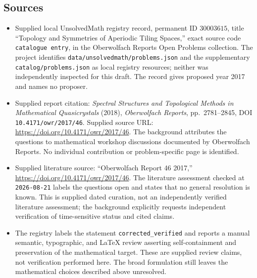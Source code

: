 \documentclass[11pt]{article}
\begin{document}
\subsection{Sources}
\begin{itemize}
\item Supplied local UnsolvedMath registry record, permanent ID \(30003615\), title ``Topology and Symmetries of Aperiodic Tiling Spaces,'' exact source code \texttt{catalogue entry}, in the Oberwolfach Reports Open Problems collection. The project identifies \texttt{data/unsolvedmath/problems.json} and the supplementary \texttt{catalog/problems.json} as local registry resources; neither was independently inspected for this draft. The record gives proposed year 2017 and names no proposer.
\item Supplied report citation: \emph{Spectral Structures and Topological Methods in Mathematical Quasicrystals} (2018), \emph{Oberwolfach Reports}, pp.\ 2781--2845, DOI \texttt{10.4171/owr/2017/46}. Supplied source URL: \url{https://doi.org/10.4171/owr/2017/46}. The background attributes the questions to mathematical workshop discussions documented by Oberwolfach Reports. No individual contribution or problem-specific page is identified.
\item Supplied literature source: ``Oberwolfach Report 46 2017,'' \url{https://doi.org/10.4171/owr/2017/46}. The literature assessment checked at \texttt{2026-08-21} labels the questions open and states that no general resolution is known. This is supplied dated curation, not an independently verified literature assessment; the background explicitly requests independent verification of time-sensitive status and cited claims.
\item The registry labels the statement \texttt{corrected\_verified} and reports a manual semantic, typographic, and LaTeX review asserting self-containment and preservation of the mathematical target. These are supplied review claims, not verification performed here. The broad formulation still leaves the mathematical choices described above unresolved.
\end{itemize}
\end{document}
